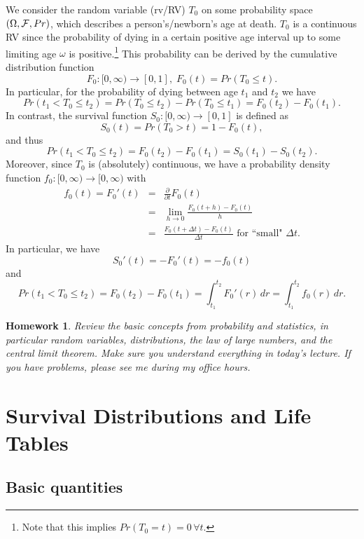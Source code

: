\documentclass[11pt,fleqn,oneside]{book}
\newtheorem{homework}{Homework}
\begin{document}
We consider the random variable (rv/RV) $T_0$ on some probability space $\left(\Omega, {\cal F}, Pr\right)$, which describes a person's/newborn's age at death. $T_0$ is a continuous RV since the probability of dying in a certain positive age interval up to some limiting age $\omega$ is positive.\footnote{Note that this implies $Pr(T_0=t) = 0\, \forall t$.} This probability can be derived by the cumulative distribution function
$$
F_0: [0,\infty) \rightarrow [0,1],\;F_0(t) = Pr(T_0\leq t).
$$
In particular, for the probability of dying between age $t_1$ and $t_2$ we have
$$
Pr(t_1 < T_0 \leq t_2)= Pr(T_0 \leq t_2) - Pr(T_0 \leq t_1) = F_0(t_2) - F_0(t_1).
$$
In contrast, the survival function $S_0:[0,\infty) \rightarrow [0,1]$ is defined as 
$$
S_0(t) = Pr(T_0>t) = 1 - F_0(t),
$$
and thus
$$
Pr(t_1 < T_0 \leq t_2) = F_0(t_2) - F_0(t_1) = S_0(t_1) - S_0(t_2).
$$
Moreover, since $T_0$ is (absolutely) continuous, we have a probability density function
$f_0:[0,\infty) \rightarrow [0,\infty)$ with
\begin{eqnarray}
f_0(t) = F_0'(t) &=& \frac{\partial}{\partial t} F_0(t) \nonumber \\
&=& \lim_{h\rightarrow 0} \frac{F_0(t+h) - F_0(t)}{h} \nonumber \\
&=& \frac{F_0(t + \Delta t) - F_0(t)}{\Delta t} \text{ for ``small" } \Delta t. \label{EQDENSFCT}
\end{eqnarray}
In particular, we have
$$
S_0'(t) = -F_0'(t) = -f_0(t)
$$
and
$$
Pr(t_1 < T_0 \leq t_2) = F_0(t_2) - F_0(t_1) = \int_{t_1}^{t_2} F_0'(r)\,dr = \int_{t_1}^{t_2} f_0(r)\,dr.
$$

\begin{homework}
Review the basic concepts from probability and statistics, in particular random variables, distributions, the law of large numbers, and the central limit theorem. Make sure you understand everything in today's lecture. If you have problems, please see me during my office hours.
\end{homework}


\chapter{Survival Distributions and Life Tables}
\label{CHAPSURVDIS}

\section{Basic quantities}
\label{SECBASICS}
\end{document}
